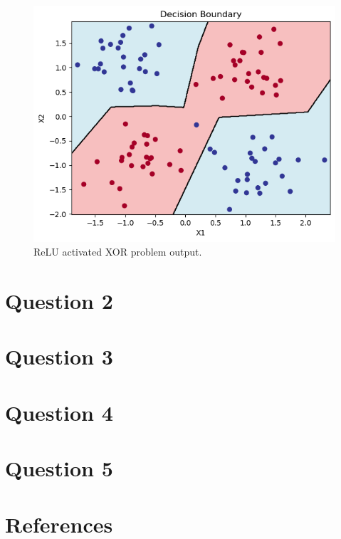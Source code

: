 \documentclass{assignment}
\begin{document}
\begin{figure}
    \centering
    \includegraphics[width=1\textwidth]{figures/q1_relu.png}
    \caption{ReLU activated XOR problem output.}
    \label{fig:relu_q1}
\end{figure}
\section{Question 2}

\section{Question 3}

\section{Question 4}

\section{Question 5}




\newpage
\section{References}
\nocite{*} 
   
     
\end{document}

